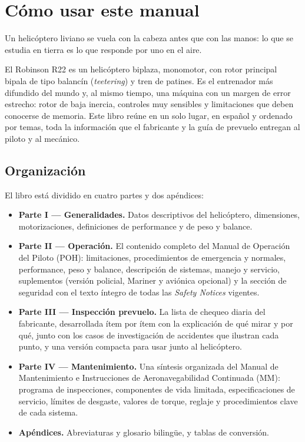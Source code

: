 \chapter{Cómo usar este manual}

\opening{Un helicóptero liviano se vuela con la cabeza antes que con las manos: lo que se estudia en tierra es lo que responde por uno en el aire.}

El Robinson R22 es un helicóptero biplaza, monomotor, con rotor principal bipala de tipo balancín (\emph{teetering}) y tren de patines. Es el entrenador más difundido del mundo y, al mismo tiempo, una máquina con un margen de error estrecho: rotor de baja inercia, controles muy sensibles y limitaciones que deben conocerse de memoria. Este libro reúne en un solo lugar, en español y ordenado por temas, toda la información que el fabricante y la guía de prevuelo entregan al piloto y al mecánico.

\section{Organización}

El libro está dividido en cuatro partes y dos apéndices:

\begin{itemize}
  \item \textbf{Parte I --- Generalidades.} Datos descriptivos del helicóptero, dimensiones, motorizaciones, definiciones de performance y de peso y balance.
  \item \textbf{Parte II --- Operación.} El contenido completo del Manual de Operación del Piloto (POH): limitaciones, procedimientos de emergencia y normales, performance, peso y balance, descripción de sistemas, manejo y servicio, suplementos (versión policial, Mariner y aviónica opcional) y la sección de seguridad con el texto íntegro de todas las \emph{Safety Notices} vigentes.
  \item \textbf{Parte III --- Inspección prevuelo.} La lista de chequeo diaria del fabricante, desarrollada ítem por ítem con la explicación de qué mirar y por qué, junto con los casos de investigación de accidentes que ilustran cada punto, y una versión compacta para usar junto al helicóptero.
  \item \textbf{Parte IV --- Mantenimiento.} Una síntesis organizada del Manual de Mantenimiento e Instrucciones de Aeronavegabilidad Continuada (MM): programa de inspecciones, componentes de vida limitada, especificaciones de servicio, límites de desgaste, valores de torque, reglaje y procedimientos clave de cada sistema.
  \item \textbf{Apéndices.} Abreviaturas y glosario bilingüe, y tablas de conversión.
\end{itemize}

